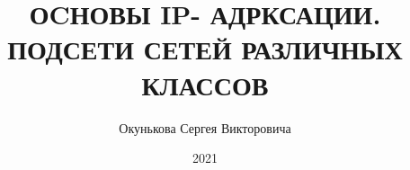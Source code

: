 \documentclass[bachelor, och, labwork]{shiza}
\begin{document}
\chair{}

\title{ОCНОВЫ IP- АДРКСАЦИИ. ПОДСЕТИ СЕТЕЙ РАЗЛИЧНЫХ КЛАССОВ}






\author{Окунькова Сергея Викторовича}








\date{2021}

\maketitle

\end{document}
